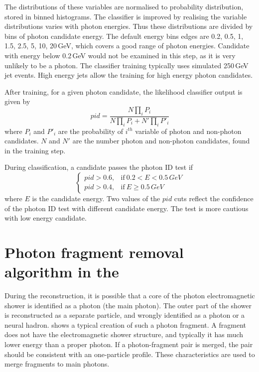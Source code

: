 The distributions of these variables are normalised to probability distribution, stored in binned histograms. The classifier is improved by realising the variable distributions varies with photon energies. Thus these distributions are divided by bins of photon candidate energy. The default energy bins edges are 0.2, 0.5, 1, 1.5, 2.5, 5, 10, 20\,GeV, which covers a good range of photon energies. Candidate with energy below 0.2\,GeV would not be examined in this step, as it is very unlikely to be a photon. The classifier training typically uses simulated 250\,GeV jet events. High energy jets allow the training for high energy photon candidates.

After training, for a given photon candidate, the likelihood classifier output is given by
\begin{equation}
pid = \frac{N\prod_{i}{P_i}}{N\prod_{i}{P_i} + N'\prod_{i}{P'_i}}
\end{equation}
where $P_i$ and $P'_i$ are the probability of $i^{th}$ variable of photon and non-photon candidates. $N$ and $N'$ are the number photon and non-photon candidates, found in the training step.

During classification, a candidate passes the photon ID test if
\begin{equation}
\begin{cases}
  pid > 0.6, & \text{if}\ 0.2 < E < 0.5\,GeV\\
  pid > 0.4, & \text{if}\ E \geqslant 0.5\,GeV
\end{cases}
\end{equation}
where $E$ is the candidate energy. Two values of the $pid$ cuts reflect the confidence of the photon ID test with different candidate energy. The test is more cautious with low energy candidate.


\section{Photon fragment removal algorithm in the \ECAL}
\label{sec:photonFragRemoval}
During the reconstruction, it is possible that a core of the photon electromagnetic shower is identified as a photon (the main photon). The outer part of the shower is reconstructed as a separate particle, and wrongly identified as a photon or a neural hadron.  shows a typical creation of such a photon fragment. A fragment does not have the electromagnetic shower structure, and typically it has much lower energy than a proper photon. If a photon-fragment pair is merged, the pair should be consistent with an one-particle profile. These characteristics are used to merge fragments to main photons.

